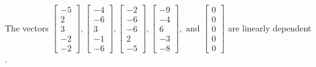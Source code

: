 \begin{exercise}
\begin{exerciseStatement}
  \end{exerciseStatement}
  \begin{exerciseAnswer}
   The vectors \(\left[\begin{array}{r}
-5 \\
2 \\
3 \\
-2 \\
-2
\end{array}\right] , \left[\begin{array}{r}
-4 \\
-6 \\
3 \\
-1 \\
-6
\end{array}\right] , \left[\begin{array}{r}
-2 \\
-6 \\
-6 \\
2 \\
-5
\end{array}\right] , \left[\begin{array}{r}
-9 \\
-4 \\
6 \\
-3 \\
-8
\end{array}\right] , \text{ and } \left[\begin{array}{r}
0 \\
0 \\
0 \\
0 \\
0
\end{array}\right]\) are 
  	 linearly dependent  .
  


  \end{exerciseAnswer}
\end{exercise}